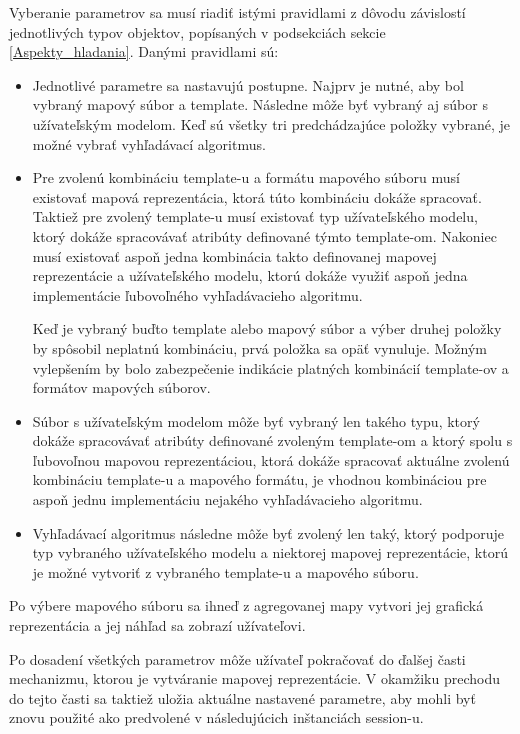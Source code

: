 Vyberanie parametrov sa musí riadiť istými pravidlami z dôvodu závislostí jednotlivých typov objektov, popísaných v podsekciách sekcie \ref{Aspekty_hladania}. Danými pravidlami sú:
\begin{itemize}
    \item Jednotlivé parametre sa nastavujú postupne. Najprv je nutné, aby bol vybraný mapový súbor a template. Následne môže byť vybraný aj súbor s užívateľským modelom. Keď sú všetky tri predchádzajúce položky vybrané, je možné vybrať vyhľadávací algoritmus. 
    \item Pre zvolenú kombináciu template-u a formátu mapového súboru musí existovať mapová reprezentácia, ktorá túto kombináciu dokáže spracovať. Taktiež pre zvolený template-u musí existovať typ užívateľského modelu, ktorý dokáže spracovávať atribúty definované týmto template-om. Nakoniec musí existovať aspoň jedna kombinácia takto definovanej mapovej reprezentácie a užívateľského modelu, ktorú dokáže využiť aspoň jedna implementácie ľubovoľného vyhľadávacieho algoritmu.   
    
    Keď je vybraný buďto template alebo mapový súbor a výber druhej položky by spôsobil neplatnú kombináciu, prvá položka sa opäť vynuluje. Možným vylepšením by bolo zabezpečenie indikácie platných kombinácií template-ov a formátov mapových súborov.
    \item Súbor s užívateľským modelom môže byť vybraný len takého typu, ktorý dokáže spracovávať atribúty definované zvoleným template-om a ktorý spolu s ľubovoľnou mapovou reprezentáciou, ktorá dokáže spracovať aktuálne zvolenú kombináciu template-u a mapového formátu, je vhodnou kombináciou pre aspoň jednu implementáciu nejakého vyhľadávacieho algoritmu. 
    \item Vyhľadávací algoritmus následne môže byť zvolený len taký, ktorý podporuje typ vybraného užívateľského modelu a niektorej mapovej reprezentácie, ktorú je možné vytvoriť z vybraného template-u a mapového súboru.
\end{itemize}    

Po výbere mapového súboru sa ihneď z agregovanej mapy vytvori jej grafická reprezentácia a jej náhľad sa zobrazí užívateľovi.

Po dosadení všetkých parametrov môže užívateľ pokračovať do ďalšej časti mechanizmu, ktorou je vytváranie mapovej reprezentácie. V okamžiku prechodu do tejto časti sa taktiež uložia aktuálne nastavené parametre, aby mohli byť znovu použité ako predvolené v následujúcich inštanciách session-u. 


